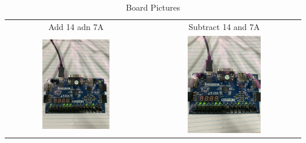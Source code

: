 \documentclass[11pt]{article}
\begin{document}
\begin{table}[h]\centering
	\begin{tabular}{cc}
		Add 14 adn 7A & Subtract 14 and 7A \\
		\includegraphics [width=0.5\textwidth,trim=0 0 0 0, clip, angle = 270]{ADD} &
		\includegraphics [width=0.5\textwidth,trim=0 0 0 0, clip, angle = 270]{SUB} \\
	\end{tabular}
	\caption{Board Pictures}
	\label{fig:sim_with_table}
\end{table}
\end{document}
